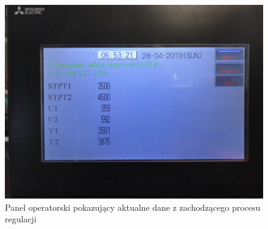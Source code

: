 \begin{figure}[H]
\includegraphics[scale=0.09]{../data/lab/thermal_object/zad5/IMG_0966.JPG}
\caption{Panel operatorski pokazujący aktualne dane z zachodzącego procesu regulacji}
\end{figure}